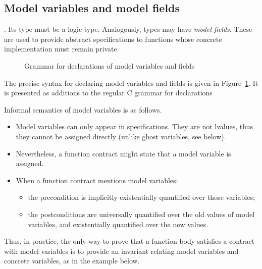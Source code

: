 \subsection{Model variables and model fields}
\label{sec:model}
 . Its type must be a logic type. Analogously,
types may have \emph{model fields}.  These are
used to provide abstract specifications to functions whose concrete
implementation must remain private.

\begin{figure}[b]
  \begin{cadre}
      
    \end{cadre}
  \caption{Grammar for declarations of model variables and fields}
\label{fig:gram:model}
\end{figure}


The precise syntax for declaring model variables and fields is given
in Figure~\ref{fig:gram:model}. It is presented as additions to the
regular C grammar for declarations

Informal semantics of model variables is as follows.
\begin{itemize}
\item Model variables can only appear in specifications. They are not
  lvalues, thus they cannot be assigned directly (unlike ghost variables,
  see below).
\item Nevertheless, a function contract might state that a model variable
  is assigned.
\item When a function contract mentions model variables:
  \begin{itemize}
  \item the precondition is implicitly existentially quantified over
    those variables;
  \item the postconditions are universally quantified over the old
    values of model variables, and existentially quantified over the new values.
  \end{itemize}
\end{itemize}
Thus, in practice, the only way to prove that a function body
satisfies a contract with model variables is to provide an invariant
relating model variables and concrete variables, as in the example
below.

